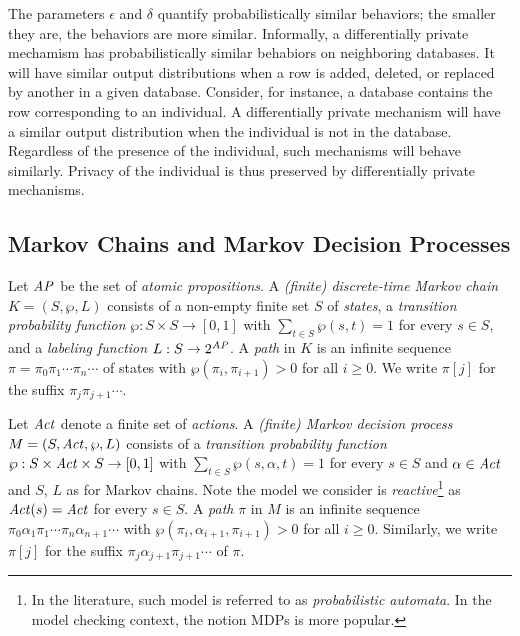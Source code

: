 The parameters $\epsilon$ and $\delta$ quantify probabilistically
similar behaviors;
the smaller they are, the behaviors are more similar.
Informally, a differentially private mechamism has probabilistically
similar behabiors on neighboring databases. It will have similar
output distributions when a row is added, deleted, or replaced by
another in a given
database. Consider, for instance, a database contains the row
corresponding to an individual. A differentially private mechanism
will have a similar output distribution when the individual is not in
the database. Regardless of the presence of the individual, such
mechanisms will behave similarly. Privacy of the individual is thus
preserved by differentially private mechanisms. 

\subsection{Markov Chains and Markov Decision Processes}

Let $\mathit{AP}$ be the set of \emph{atomic propositions}.
A \emph{(finite) discrete-time Markov chain} $K = (S, \wp, L)$ consists
of a non-empty finite set $S$ of \emph{states}, a \emph{transition
  probability function} $\wp : S \times S \rightarrow [0, 1]$ with
$\sum_{t \in S} \wp(s, t) = 1$ for every $s \in S$, and
a \emph{labeling function} $L : S \rightarrow 2^{\mathit{AP}}$. A \emph{path}
in $K$ is an infinite sequence $\pi = \pi_0 \pi_1 \cdots \pi_n \cdots$
of states with $\wp (\pi_i, \pi_{i+1}) > 0$ for all $i \geq 0$. We write
$\pi[j]$ for the suffix $\pi_j \pi_{j+1} \cdots$. %

Let $\mathit{Act}$ denote a finite set of \emph{actions}.
A \emph{(finite) Markov decision process} $M = (S, \mathit{Act}, \wp, L)$ consists
of a \emph{transition probability function} $\wp : S \times \mathit{Act}
\times S \rightarrow [0, 1]$ with $\sum_{t \in S} \wp(s, \alpha, t)
= 1$ for every $s \in S$ and $\alpha \in \mathit{Act}$ and $S$,
$L$ as for Markov chains. Note the model we consider is \emph{reactive}\footnote{In the literature, such model is referred to as \emph{probabilistic automata}\cite{}. In the model checking context, the notion MDPs is more popular.} as $\mathit{Act}(s) = \mathit{Act}$
for every $s \in S$.
A \emph{path} $\pi$ in $M$ is an infinite sequence $\pi_0 \alpha_1
\pi_1 \cdots \pi_n \alpha_{n+1} \cdots$ with
$\wp(\pi_i, \alpha_{i+1}, \pi_{i+1}) > 0$ for all $i \geq 0$.
Similarly, we write $\pi[j]$ for the suffix $\pi_j \alpha_{j+1}
\pi_{j+1} \cdots$ of $\pi$.

